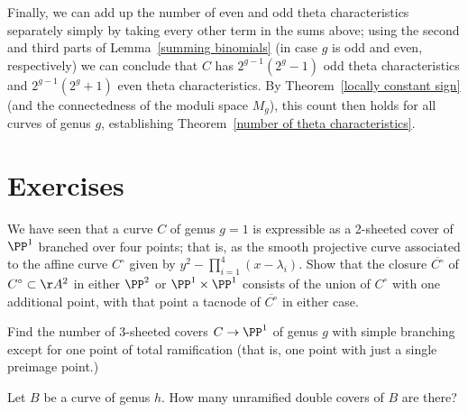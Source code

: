 Finally, we can add up the number of even and odd theta characteristics separately simply by taking every other term in the sums above; using the second and third parts of Lemma~\ref{summing binomials} (in case $g$ is odd and even, respectively) we can conclude that $C$ has $2^{g-1}(2^g-1)$ odd theta characteristics and $2^{g-1}(2^g+1)$ even theta characteristics. By Theorem~\ref{locally constant sign} (and the connectedness of the moduli space $M_g$), this count then holds for all curves of genus $g$, establishing Theorem~\ref{number of theta characteristics}.

\section{Exercises}
 \begin{exercise}
  We have seen that a curve $C$ of genus $g=1$ is expressible as a 2-sheeted cover of $\PP^1$ branched over four points; that is, as the smooth projective curve associated to the affine curve $C^\circ$ given by $y^2 - \prod_{i=1}^4 (x-\lambda_i)$. Show that the closure $\overline{C^\circ}$ of $C^\circ \subset \AA^2$ in either $\PP^2$ or $\PP^1 \times \PP^1$ consists of the union of $C^\circ$ with one additional point, with that point a tacnode of $\overline{C^\circ}$ in either case.
  
  \end{exercise}

\begin{exercise}
Find the number of 3-sheeted covers $C \to \PP^1$ of genus $g$ with simple branching except for one point of total ramification (that is, one point with just a single preimage point.)

\end{exercise}


\begin{exercise}
Let $B$ be a curve of genus $h$. How many unramified double covers of $B$ are there?

\end{exercise}

